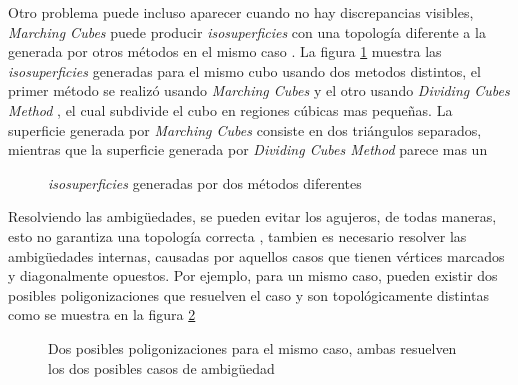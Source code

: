 Otro problema puede incluso aparecer cuando no hay discrepancias visibles, \emph{Marching Cubes} puede producir \emph{isosuperficies} con una topología diferente a la generada por otros métodos en el mismo caso \cite{Chernyaev95marchingcubes}. La figura \ref{f:estadoDelArte:Chernyaev95marchingcubes_2} muestra las \emph{isosuperficies} generadas para el mismo cubo usando dos metodos distintos, el primer método se realizó usando \emph{Marching Cubes} y el otro usando \emph{Dividing Cubes Method} \cite{Cline88twoalgorithms}, el cual subdivide el cubo en regiones cúbicas mas pequeñas. La superficie generada por \emph{Marching Cubes} consiste en dos triángulos separados, mientras que la superficie generada por \emph{Dividing Cubes Method} parece mas un 

\begin{figure}[!htb]
\centering
\caption{\emph{isosuperficies} generadas por dos métodos diferentes \cite{Chernyaev95marchingcubes}}
\label{f:estadoDelArte:Chernyaev95marchingcubes_2}
\end{figure}

Resolviendo las ambigüedades, se pueden evitar los agujeros, de todas maneras, esto no garantiza una topología correcta \cite{Lewiner03efficientimplementation}, tambien es necesario resolver las ambigüedades internas, causadas por aquellos casos que tienen vértices marcados y diagonalmente opuestos. Por ejemplo, para un mismo caso, pueden existir dos posibles poligonizaciones que resuelven el caso y son topológicamente distintas como se muestra en la figura \ref{f:estadoDelArte:Lewiner03efficientimplementation_2}

\begin{figure}[!htb]
\centering
\caption{Dos posibles poligonizaciones para el mismo caso, ambas resuelven los dos posibles casos de ambigüedad \cite{Lewiner03efficientimplementation}}
\label{f:estadoDelArte:Lewiner03efficientimplementation_2}
\end{figure}


